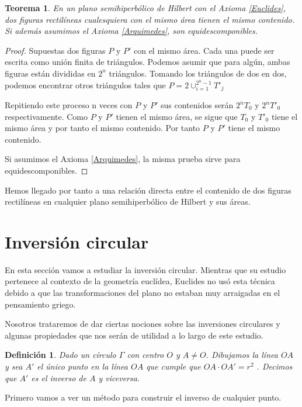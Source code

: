 \documentclass[a4paper]{amsart}
\theoremstyle{plain}
\newtheorem{theorem}{Teorema}
\newtheorem{definition}{Definición}
\begin{document}
\begin{theorem}
En un plano semihiperbólico de Hilbert con el Axioma \ref{Euclides}, dos figuras rectilíneas cualesquiera con el mismo área tienen el mismo contenido. Si además asumimos el Axioma \ref{Arquimedes}, son equidescomponibles.
\end{theorem}

\begin{proof}
Supuestas dos figuras $P$ y $P'$ con el mismo área. Cada una puede ser escrita como unión finita de triángulos. Podemos asumir que para algún, ambas figuras están divididas en $2^n$ triángulos. Tomando los triángulos de dos en dos, podemos encontrar otros triángulos tales que $P=2\cup_{i=1}^{2^n-1}T'_j$

Repitiendo este proceso n veces con $P$ y $P'$ sus contenidos serán $2^nT_0$ y $2^nT'_0$ respectivamente. Como $P$ y $P'$ tienen el mismo área, se sigue que $T_0$ y $T'_0$ tiene el mismo área y por tanto el mismo contenido. Por tanto $P$ y $P'$ tiene el mismo contenido.

Si asumimos el Axioma \ref{Arquimedes}, la misma prueba sirve para equidescomponibles.
\end{proof}

Hemos llegado por tanto a una relación directa entre el contenido de dos figuras rectilíneas en cualquier plano semihiperbólico de Hilbert y sus áreas.

\section{Inversión circular}

En esta sección vamos a estudiar la inversión circular. Mientras que su estudio pertenece al contexto de la geometría euclídea, Euclides no usó esta técnica debido a que las transformaciones del plano no estaban muy arraigadas en el pensamiento griego. 

Nosotros trataremos de dar ciertas nociones sobre las inversiones circulares y algunas propiedades que nos serán de utilidad a lo largo de este estudio.

\begin{definition}
Dado un círculo $\Gamma$ con centro $O$ y $A\neq O$. Dibujamos la línea $OA$ y sea $A'$ el único punto en la línea $OA$ que cumple que $OA\cdot OA'=r^2$ . Decimos que $A'$ es el inverso de $A$ y viceversa.
\end{definition}

Primero vamos a ver un método para construir el inverso de cualquier punto.
\end{document}
